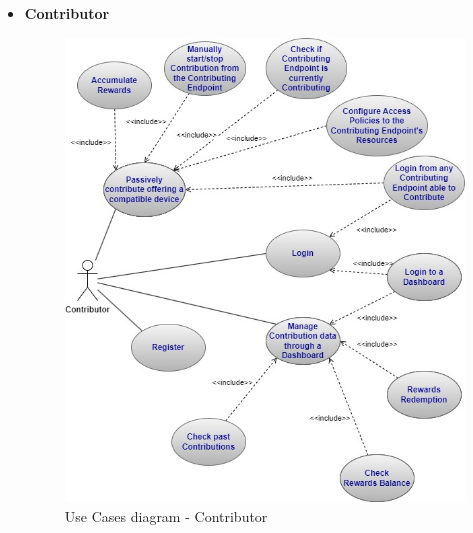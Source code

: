 \begin{itemize}
\item \textbf{Contributor}
\begin{figure}[!ht]
    \centering
    \includegraphics[scale=0.62]{document/chapters/chapter_4/images/contributor_use_cases.jpg}
    \caption{Use Cases diagram - Contributor}
    \label{fig:use_cases_contributor}
\end{figure}


\end{itemize}
